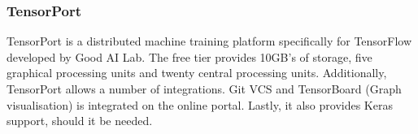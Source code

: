 \subsubsection{TensorPort}
TensorPort is a distributed machine training platform specifically for TensorFlow developed by Good AI Lab. The free tier provides 10GB's of storage, five graphical processing units and twenty central processing units. Additionally, TensorPort allows a number of integrations. Git VCS and TensorBoard (Graph visualisation) is integrated on the online portal. Lastly, it also provides Keras support, should it be needed.




